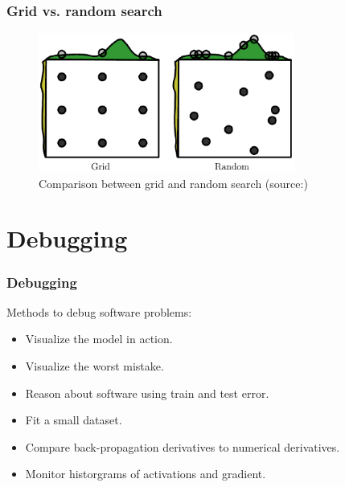 \documentclass{beamer}
\begin{document}
\begin{frame}
    \frametitle{Grid vs. random search}
    \begin{figure}
        \includegraphics[width=0.75\textwidth]{grid_vs_random_search}
        \caption{Comparison between grid and random search 
        (source:\cite{goodfellow-et-al-2016})}
        \centering
    \end{figure}
\end{frame}

\section{Debugging}\label{sec:debugging}
\begin{frame}
    \frametitle{Debugging}
    Methods to debug software problems:
    \begin{itemize}
        \item Visualize the model in action.
        \item Visualize the worst mistake.
        \item Reason about software using train and test error.
        \item Fit a small dataset.
        \item Compare back-propagation derivatives to numerical derivatives.
        \item Monitor historgrams of activations and gradient.
    \end{itemize}

\end{frame}



\end{document}
